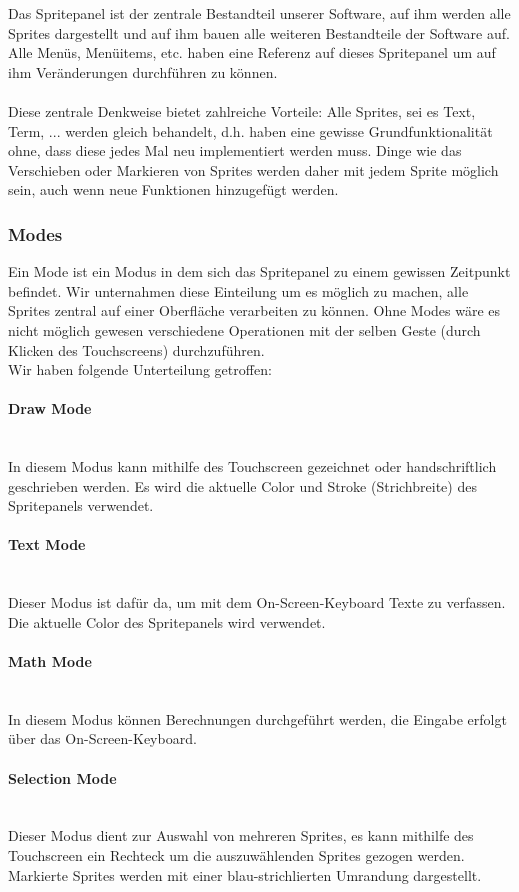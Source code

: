 Das Spritepanel ist der zentrale Bestandteil unserer Software, auf ihm werden alle Sprites dargestellt und auf ihm bauen alle weiteren Bestandteile der Software auf. Alle Menüs, Menüitems, etc. haben eine Referenz auf dieses Spritepanel um auf ihm Veränderungen durchführen zu können.\\
\\
Diese zentrale Denkweise bietet zahlreiche Vorteile: Alle Sprites, sei es Text, Term, ... werden gleich behandelt, d.h. haben eine gewisse Grundfunktionalität ohne, dass diese jedes Mal neu implementiert werden muss. Dinge wie das Verschieben oder Markieren von Sprites werden daher mit jedem Sprite möglich sein, auch wenn neue Funktionen hinzugefügt werden.

\subsubsection{Modes}

Ein Mode ist ein Modus in dem sich das Spritepanel zu einem gewissen Zeitpunkt befindet. Wir unternahmen diese Einteilung um es möglich zu machen, alle Sprites zentral auf einer Oberfläche verarbeiten zu können. Ohne Modes wäre es nicht möglich gewesen verschiedene Operationen mit der selben Geste (durch Klicken des Touchscreens) durchzuführen.\\
Wir haben folgende Unterteilung getroffen:

\setcounter{secnumdepth}{4}
\paragraph{Draw Mode}\ \\
In diesem Modus kann mithilfe des Touchscreen gezeichnet oder handschriftlich geschrieben werden. Es wird die aktuelle Color und Stroke (Strichbreite) des Spritepanels verwendet.
\paragraph{Text Mode}\ \\
Dieser Modus ist dafür da, um mit dem On-Screen-Keyboard Texte zu verfassen. Die aktuelle Color des Spritepanels wird verwendet. 
\paragraph{Math Mode}\ \\
In diesem Modus können Berechnungen durchgeführt werden, die Eingabe erfolgt über das On-Screen-Keyboard. 
\paragraph{Selection Mode}\ \\
Dieser Modus dient zur Auswahl von mehreren Sprites, es kann mithilfe des Touchscreen ein Rechteck um die auszuwählenden Sprites gezogen werden. Markierte Sprites werden mit einer blau-strichlierten Umrandung dargestellt.
